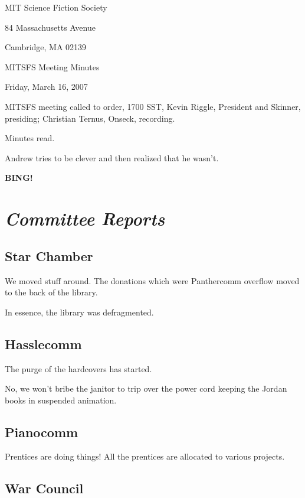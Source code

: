 \documentclass[10pt]{article}
\newcommand{\bing}{{\bf BING!} }
\newcommand{\goto}[1]{\bing \vskip 12pt \section*{{\em{#1}}}}
\begin{document}
\begin{center}

MIT Science Fiction Society

84 Massachusetts Avenue

Cambridge, MA 02139

\vspace{12pt}

MITSFS Meeting Minutes

Friday, March 16, 2007

\end{center}

\vspace{18pt}

\setlength{\parskip}{6pt}

\noindent
MITSFS meeting called to order, 1700 SST,
Kevin Riggle, President and Skinner, presiding; Christian Ternus, Onseck, recording.

Minutes read.

Andrew tries to be clever and then realized that he wasn't.

\goto{Committee Reports}

\subsection*{Star Chamber}

We moved stuff around.  The donations which were Panthercomm overflow moved to
the back of the library.  

In essence, the library was defragmented.

\subsection*{Hasslecomm}

The purge of the hardcovers has started.

No, we won't bribe the janitor to trip over the power cord keeping the Jordan books in suspended animation.

\subsection*{Pianocomm}

Prentices are doing things!  All the prentices are allocated to various projects.

\subsection*{War Council}
\end{document}
